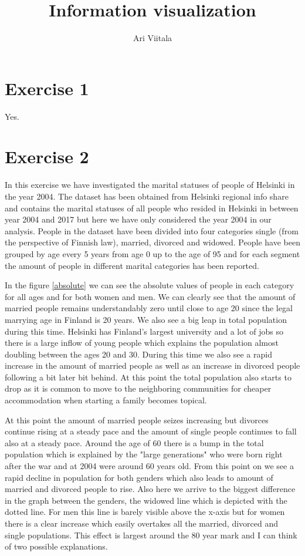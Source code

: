 \documentclass{article}
\title{Information visualization}
\author{Ari Viitala}
\begin{document}
	\maketitle

\section*{Exercise 1}
Yes.
\section*{Exercise 2}

In this exercise we have investigated the marital statuses of people of Helsinki in the year 2004. The dataset has been obtained from Helsinki regional info share and contains the marital statuses of all people who resided in Helsinki in between year 2004 and 2017 but here we have only considered the year 2004 in our analysis. People in the dataset have been divided into four categories single (from the perspective of Finnish law), married, divorced and widowed. People have been grouped by age every 5 years from age 0 up to the age of 95 and for each segment the amount of people in different marital categories has been reported.

In the figure \ref{absolute} we can see the absolute values of people in each category for all ages and for both women and men. We can clearly see that the amount of married people remains understandably zero until close to age 20 since the legal marrying age in Finland is 20 years. We also see a big leap in total population during this time. Helsinki has Finland's largest university and a lot of jobs so there is a large inflow of young people which explains the population almost doubling between the ages 20 and 30. During this time we also see a rapid increase in the amount of married people as well as an increase in divorced people following a bit later bit behind. At this point the total population also starts to drop as it is common to move to the neighboring communities for cheaper accommodation when starting a family becomes topical. 

At this point the amount of married people seizes increasing but divorces continue rising at a steady pace and the amount of single people continues to fall also at a steady pace. Around the age of 60 there is a bump in the total population which is explained by the "large generations" who were born right after the war and at 2004 were around 60 years old. From this point on we see a rapid decline in population for both genders which also leads to amount of married and divorced people to rise. Also here we arrive to the biggest difference in the graph between the genders, the widowed line which is depicted with the dotted line. For men this line is barely visible above the x-axis but for women there is a clear increase which easily overtakes all the married, divorced and single populations. This effect is largest around the 80 year mark and I can think of two possible explanations. 
\end{document}
